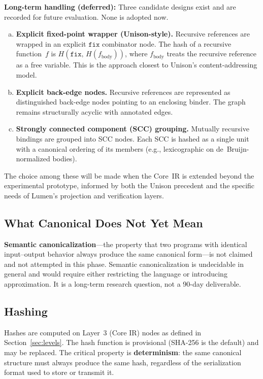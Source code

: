\documentclass[11pt]{article}
\begin{document}
\textbf{Long-term handling (deferred):}  Three candidate designs exist
and are recorded for future evaluation.  None is adopted now.
\begin{enumerate}[(a)]
  \item \textbf{Explicit fixed-point wrapper (Unison-style).}
        Recursive references are wrapped in an explicit
        $\texttt{fix}$ combinator node.  The hash of a recursive
        function~$f$ is $H(\texttt{fix},\, H(f_{\text{body}}))$,
        where $f_{\text{body}}$ treats the recursive reference as a
        free variable.  This is the approach closest to Unison's
        content-addressing model.
  \item \textbf{Explicit back-edge nodes.}  Recursive references are
        represented as distinguished back-edge nodes pointing to an
        enclosing binder.  The graph remains structurally acyclic with
        annotated edges.
  \item \textbf{Strongly connected component (SCC) grouping.}
        Mutually recursive bindings are grouped into SCC nodes.  Each
        SCC is hashed as a single unit with a canonical ordering of
        its members (e.g., lexicographic on de~Bruijn-normalized
        bodies).
\end{enumerate}
The choice among these will be made when the Core~IR is extended
beyond the experimental prototype, informed by both the Unison
precedent and the specific needs of Lumen's projection and
verification layers.

\subsection*{What Canonical Does Not Yet Mean}

\textbf{Semantic canonicalization}---the property that two programs
with identical input--output behavior always produce the same canonical
form---is not claimed and not attempted in this phase.
Semantic canonicalization is undecidable in general and would require
either restricting the language or introducing approximation.  It is a
long-term research question, not a 90-day deliverable.

\subsection*{Hashing}

Hashes are computed on Layer~3 (Core IR) nodes as defined in
Section~\ref{sec:levels}.  The hash function is provisional
(SHA-256 is the default) and may be replaced.  The critical property
is \textbf{determinism}: the same canonical structure must always
produce the same hash, regardless of the serialization format used to
store or transmit it.
\end{document}
